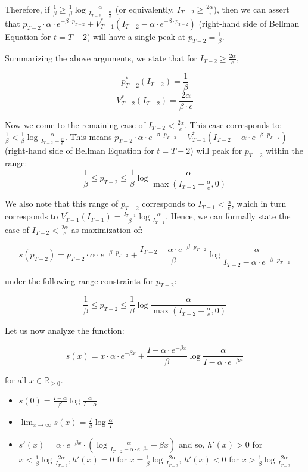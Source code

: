 \documentclass[12pt]{amsart}
\begin{document}
Therefore, if $\frac 1 \beta \geq \frac 1 \beta \log \frac \alpha {I_{T-2} - \frac \alpha e}$ (or equivalently, $I_{T-2} \geq \frac {2 \alpha} e$), then we can assert that $p_{T-2} \cdot \alpha \cdot e^{-\beta \cdot p_{T-2}}  + V_{T-1}^*(I_{T-2} - \alpha \cdot e^{-\beta \cdot p_{T-2}})$ (right-hand side of Bellman Equation for $t=T-2$) will have a single peak at $p_{T-2} = \frac 1 \beta$.

Summarizing the above arguments, we state that for $I_{T-2} \geq \frac {2 \alpha} e$,

$$p_{T-2}^*(I_{T-2}) = \frac 1 \beta$$
$$V_{T-2}^*(I_{T-2}) = \frac {2 \alpha} {\beta \cdot e}$$

Now we come to the remaining case of $I_{T-2} <  \frac {2 \alpha} e$. This case corresponds to: $\frac 1 \beta < \frac 1 \beta \log \frac \alpha {I_{T-2} - \frac \alpha e}$. This means $p_{T-2} \cdot \alpha \cdot e^{-\beta \cdot p_{T-2}}  + V_{T-1}^*(I_{T-2} - \alpha \cdot e^{-\beta \cdot p_{T-2}})$ (right-hand side of Bellman Equation for $t=T-2$) will peak for $p_{T-2}$ within the range: 
$$\frac 1 \beta \leq p_{T-2} \leq \frac 1 \beta \log \frac \alpha {\max(I_{T-2} - \frac \alpha e, 0)}$$

We also note that this range of $p_{T-2}$ corresponds to $I_{T-1} < \frac \alpha e$, which in turn corresponds to $V_{T-1}^*(I_{T-1}) = \frac {I_{T-1}} {\beta} \log{ \frac {\alpha} {I_{T-1}}}$. Hence, we can formally state the case of $I_{T-2} <  \frac {2 \alpha} e$ as maximization of:

$$s(p_{T-2}) = p_{T-2} \cdot \alpha \cdot e^{-\beta \cdot p_{T-2}}  + \frac {I_{T-2} - \alpha \cdot e^{-\beta \cdot p_{T-2}}} {\beta} \log{ \frac {\alpha} {I_{T-2} - \alpha \cdot e^{-\beta \cdot p_{T-2}}}}$$

under the following range constraints for $p_{T-2}$:

$$\frac 1 \beta \leq p_{T-2} \leq \frac 1 \beta \log \frac \alpha {\max(I_{T-2} - \frac \alpha e, 0)}$$

Let us now analyze the function:

$$s(x) = x \cdot \alpha \cdot e^{-\beta x}  + \frac {I - \alpha \cdot e^{-\beta x}} {\beta} \log \frac {\alpha} {I - \alpha \cdot e^{-\beta x}}$$

for all $x \in \mathbb{R}_{\geq 0}$.

\begin{itemize}
\item $s(0) = \frac {I - \alpha} {\beta} \log \frac {\alpha} {I - \alpha}$
\item $\lim_{x \to \infty} s(x) = \frac I {\beta} \log \frac {\alpha} I$
\item $s'(x) = \alpha \cdot e^{-\beta x} \cdot (\log \frac \alpha {I_{T-2} - \alpha \cdot e^{-\beta x}} - \beta x)$ and so, $h'(x) > 0$ for $x < \frac 1 \beta \log \frac {2 \alpha} {I_{T-2}}, h'(x) = 0$ for $x = \frac 1 \beta \log \frac {2 \alpha} {I_{T-2}}$, $h'(x) < 0$ for $x > \frac 1 \beta \log \frac {2 \alpha} {I_{T-2}}$
\end{itemize}
\end{document}
